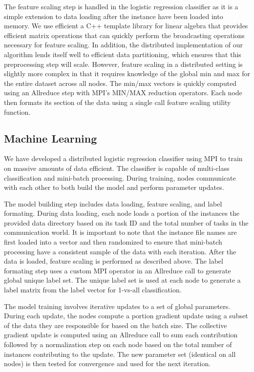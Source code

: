 The feature scaling step is handled in the logistic regression classifier as it is a simple extension to data loading after the instance have been loaded into memory.  We use efficient a C++ template library for linear algebra \cite{Eigen} that provides efficient matrix operations that can quickly perform the broadcasting operations necessary for feature scaling.  In addition, the distributed implementation of our algorithm lends itself well to efficient data partitioning, which ensures that this preprocessing step will scale.  However, feature scaling in a distributed setting is slightly more complex in that it requires knowledge of the global min and max for the entire dataset across all nodes.  The min/max vectors is quickly computed using an Allreduce step with MPI's MIN/MAX reduction operators. Each node then formats its section of the data using a single call feature scaling utility function.

\subsection{Machine Learning}
We have developed a distributed logistic regression classifier using MPI to train on massive amounts of data efficient.  The classifier is capable of multi-class classification and mini-batch processing.  During training, nodes communicate with each other to both build the model and perform parameter updates.

The model building step includes data loading, feature scaling, and label formating. During data loading, each node loads a portion of the instances the provided data directory based on its task ID and the total number of tasks in the communication world.  It is important to note that the instance file names are first loaded into a vector and then randomized to ensure that mini-batch processing have a consistent sample of the data with each iteration.  After the data is loaded, feature scaling is performed as described above.  The label formating step uses a custom MPI operator in an Allreduce call to generate global unique label set.  The unique label set is used at each node to generate a label matrix from the label vector for 1-vs-all classification.

The model training involves iterative updates to a set of global parameters.  During each update, the nodes compute a portion gradient update using a subset of the data they are responsible for based on the batch size.  The collective gradient update is computed using an Allreduce call to sum each contribution followed by a normalization step on each node based on the total number of instances contributing to the update.  The new parameter set (identical on all nodes) is then tested for convergence and used for the next iteration.

